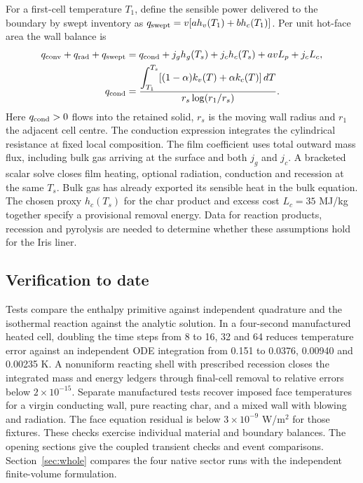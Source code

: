 For a first-cell temperature $T_1$, define the sensible power delivered to
the boundary by swept inventory as $q_{\rm swept}=v[ah_v(T_1)+bh_c(T_1)]$.
Per unit hot-face area the wall balance is
\begin{align*}
 q_{\rm conv}+q_{\rm rad}+q_{\rm swept}
 &=q_{\rm cond}+j_gh_g(T_s)+j_ch_c(T_s)+avL_p+j_cL_c,\\
 q_{\rm cond}
 &=\frac{\displaystyle\int_{T_1}^{T_s}[(1-\alpha)k_v(T)+\alpha k_c(T)]\,dT}
 {r_s\log(r_1/r_s)} .
\end{align*}
Here $q_{\rm cond}>0$ flows into the retained solid, $r_s$ is the moving wall
radius and $r_1$ the adjacent cell centre. The conduction expression integrates
the cylindrical resistance at fixed local composition. The film coefficient
uses total outward mass flux, including bulk gas arriving at the surface and
both $j_g$ and $j_c$. A bracketed scalar solve closes film heating, optional
radiation, conduction and recession at the same $T_s$. Bulk gas has already
exported its sensible heat in the bulk equation. The chosen proxy $h_c(T_s)$
for the char product and excess cost $L_c=35$ MJ/kg together specify a
provisional removal energy. Data for reaction products, recession and pyrolysis
are needed to determine whether these assumptions hold for the Iris liner.

\subsection{Verification to date}
Tests compare the enthalpy primitive against independent quadrature and the
isothermal reaction against the analytic solution. In a four-second manufactured
heated cell, doubling the time steps from 8 to 16, 32 and 64 reduces temperature
error against an independent ODE integration from 0.151 to 0.0376, 0.00940
and 0.00235 K. A nonuniform reacting shell with prescribed recession closes
the integrated mass and energy ledgers through final-cell removal to relative
errors below $2\times10^{-15}$. Separate manufactured tests recover imposed
face temperatures for a virgin conducting wall, pure reacting char, and a
mixed wall with blowing and radiation. The face equation residual is below
$3\times10^{-9}$ W/m$^2$ for those fixtures. These checks exercise individual
material and boundary balances. The opening sections give the coupled transient checks and event comparisons.
Section~\ref{sec:whole} compares the four native sector runs with the independent finite-volume formulation.

